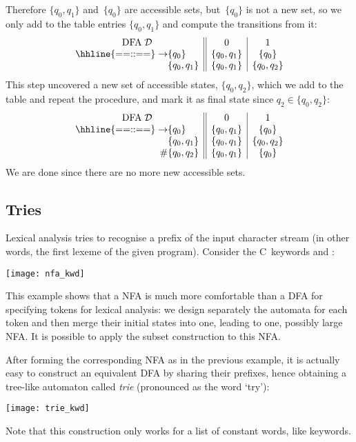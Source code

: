 Therefore \(\{q_0,q_1\}\) and~\(\{q_0\}\) are accessible sets,
but~\(\{q_0\}\) is not a new set, so we only add to the table entries
\(\{q_0, q_1\}\) and compute the transitions from it:
\begin{equation*}
  \begin{array}{r@{}l||c|c}
    \multicolumn{2}{c||}{\text{DFA} \; \mathcal{D}} & 0 & 1\\
    \hhline{==::==}
    \rightarrow & \{q_0\}      & \{q_0, q_1\} & \{q_0\}\\
                & \{q_0, q_1\} & \{q_0, q_1\} & \{q_0, q_2\}
  \end{array}
\end{equation*}
This step uncovered a new set of accessible states, \(\{q_0, q_2\}\),
which we add to the table and repeat the procedure, and mark it as
final state since \(q_2 \in \{q_0, q_2\}\):
\begin{equation*}
  \begin{array}{r@{}l||c|c}
    \multicolumn{2}{c||}{\text{DFA} \; \mathcal{D}} & 0 & 1\\
    \hhline{==::==}
    \rightarrow & \{q_0\}      & \{q_0, q_1\} & \{q_0\}\\
                & \{q_0, q_1\} & \{q_0, q_1\} & \{q_0, q_2\}\\
             \# & \{q_0, q_2\} & \{q_0, q_1\} & \{q_0\}
  \end{array}
\end{equation*}
We are done since there are no more new accessible sets.

\subsection*{Tries}

Lexical analysis tries to recognise a prefix of the input character
stream (in other words, the first lexeme of the given
program). Consider the C~keywords  and :
\begin{center}
\texttt{[image: nfa\_kwd]}
\end{center}
This example shows that a NFA is much more comfortable than a DFA for
specifying tokens for lexical analysis: we design separately the
automata for each token and then merge their initial states into one,
leading to one, possibly large NFA. It is possible to apply the subset
construction to this NFA.

After forming the corresponding NFA as in the previous example, it is
actually easy to construct an equivalent DFA by sharing their
prefixes, hence obtaining a tree-like automaton called \emph{trie}
(pronounced as the word `try'):
\begin{center}
\texttt{[image: trie\_kwd]}
\label{trie_kwd}
\end{center}
Note that this construction only works for a list of constant words,
like keywords.

